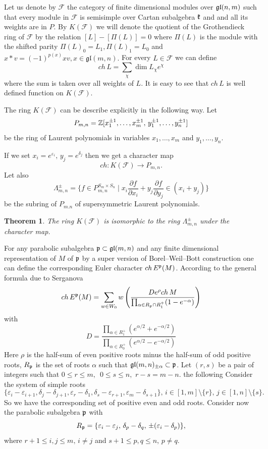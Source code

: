 \documentclass[12pt,reqno]{amsart}
\newtheorem{thm}{Theorem}[section]
\begin{document}
Let us denote by $\mathcal F$ the category of finite dimensional modules over $\frak{gl}(n,m)$ such that every module in $\mathcal F$ is semisimple over Cartan  subalgebra $\frak k$ and and all  its weights are in $P$.
By  $K(\mathcal F )$ we will denote the quotient of the Grothendieck ring of   $\mathcal F$ by the relation $[L]-[\Pi(L)]=0$ where $\Pi(L)$ is the module  with the shifted parity $\Pi(L)_0=L_1, \Pi(L)_1=L_0$ and $x*v=(-1)^{p(x)}xv,x\in\mathfrak{gl}(m,n).$ For every $L\in \mathcal F$ we can define 
$$
ch\,L=\sum_{\chi}\dim L_{\chi}e^{\chi}
$$
where the sum is taken over all weights of $L$. It is easy to see that $ch\,L$ is well defined function on $K(\mathcal F)$.

The ring $K(\mathcal F)$ can be describe explicitly in the following way.  Let 
$$
P_{m,n}=\Bbb Z[x_1^{\pm1},\dots, x_m^{\pm1},\, y_1^{\pm1},\dots, y_n^{\pm1}]
$$
be the ring of Laurent polynomials  in variables $x_1,\dots,x_m$ and $y_1,\dots, y_n.$ 

If we set $x_i=e^{\varepsilon_i},\, y_j=e^{\delta_j}$ then we get a character map 
$$
ch : K(\mathcal F)\longrightarrow P_{m,n}.
$$
 Let   also 
$$
\Lambda^{\pm}_{m,n}=\{f\in P_{m,n}^{S_m\times S_n}\mid x_i\frac{\partial f}{\partial x_i}+y_j\frac{\partial f}{\partial y_j}\in(x_i+y_j) \}
$$
be the subring of $P_{m.n}$ of supersymmetric Laurent  polynomials. 
\begin{thm}\cite{SV} The   ring  $K(\mathcal F)$ is isomorphic to the ring $\Lambda^{\pm}_{m,n}$ under the character map.
\end{thm}
For any parabolic subalgebra $\frak{p}\subset \frak{gl}(m,n)$ and any finite dimensional representation of $M$ of $\frak p$ by a super version of Borel--Weil--Bott construction one can define the corresponding Euler character $ch\,E^{\frak p}(M)$. According to the general formula due to Serganova \cite{Serga}
$$
ch\,E^{\frak p}(M)=\sum_{w\in W_0}w\left(\frac{De^{\rho}ch\,M}{\prod_{\alpha\in R_{\frak{p}}\cap R_1^+}(1-e^{-\alpha})}\right)
$$
with
$$
D=\frac{\prod_{\alpha\in R_1^+}(e^{\alpha/2}+e^{-\alpha/2})}{\prod_{\alpha\in R_0^+}(e^{\alpha/2}-e^{-\alpha/2})}
$$
Here $\rho$ is the half-sum of even positive roots minus the half-sum of odd positive roots, $R_{\frak p}$ is the set of roots $\alpha$ such that $\frak{gl}(m,n)_{\pm\alpha}\subset\frak{p}$.  Let  $(r,s)$ be  a pair of integers  such that $0\le r \le m,\,$ $ 0\le s\le n,\,\,r-s=m-n$.   the following  Consider the system of simple roots
$$
\{\varepsilon_i-\varepsilon_{i+1},\delta_j-\delta_{j+1}, \varepsilon_r-\delta_1,\delta_s-\varepsilon_{r+1},
\varepsilon_m-\delta_{s+1}\},\,i\in[1,m]\setminus\{r\},\,j\in[1,n]\setminus\{s\}.
$$
So we have the corresponding set of positive even and odd roots. 
 Consider  now the parabolic subalgebra  $\frak p$ with
$$
R_{\frak p}=\{\varepsilon_i-\varepsilon_j,\,\delta_p-\delta_q,\, \pm (\varepsilon_i-\delta_p)\},
$$
where  $r+1\le i,j\le m,\,i\ne j$ and $s+1\le p,q\le n,\,p\ne q$.
\end{document}
